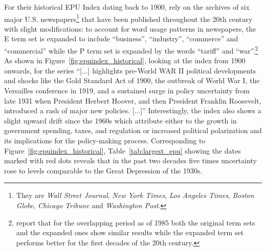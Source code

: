\documentclass[a4paper,11pt,listof=nochaptergap,oneside,pointednumbers,bibtotoc,bigheadings,liststotoc]{scrbook}
\begin{document}
For their historical EPU Index dating back to 1900, \citet{bakeretal:15} rely on the archives of six major U.S. newspapers\footnote{They are \textit{Wall Street Journal}, \textit{New York Times}, \textit{Los Angeles Times}, \textit{Boston Globe}, \textit{Chicago Tribune} and \textit{Washington Post}.} that have been published throughout the 20th century with slight modifications: to account for word usage patterns in newspapers, the E term set is expanded to include ``business'', ``industry'', ``commerce'' and ``commercial'' while the P term set is expanded by the words ``tariff'' and ``war''.\footnote{\citet{bakeretal:15} report that for the overlapping period as of 1985 both the original term sets and the expanded ones show similar results while the expanded term set performs better for the first decades of the 20th century.} As shown in Figure~\ref{fig:epuindex_historical}, looking at the index from 1900 onwards, for \citet[p. 1594]{bakeretal:15} the series ``[...] highlights pre-World WAR II political developments and shocks like the Gold Standard Act of 1900, the outbreak of World War I, the Versailles conference in 1919, and a sustained surge in policy uncertainty from late 1931 when President Herbert Hoover, and then President Franklin Roosevelt, introduced a rash of major new policies. [...]'' Interestingly, the index also shows a slight upward drift since the 1960s which \citet{bakeretal:14} attribute either to the growth in government spending, taxes, and regulation or increased political polarization and its implications for the policy-making process. Corresponding to Figure~\ref{fig:epuindex_historical}, Table~\ref{tab:largest_epu} showing the dates marked with red dots reveals that in the past two decades five times uncertainty rose to levels comparable to the Great Depression of the 1930s.




\begin{table}[!h]
\centering
\caption{7 Largest Spikes of U.S. EPU Historical}
\label{tab:largest_epu}
\centering
\end{table}
\end{document}
